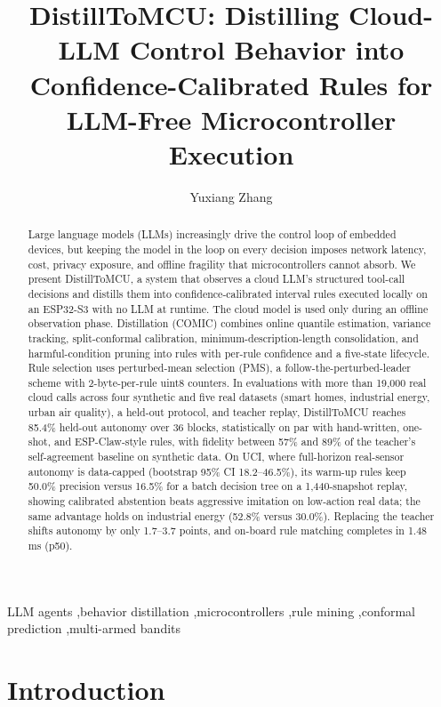 \documentclass[review]{elsarticle}
\title{DistillToMCU: Distilling Cloud-LLM Control Behavior into
Confidence-Calibrated Rules for LLM-Free Microcontroller Execution}
\author[1]{Yuxiang Zhang\corref{cor1}}
\affiliation[1]{organization={Anhui Normal University},
addressline={Huajin Campus, No. 189 Jiuhua South Road, Yijiang District},
city={Wuhu}, postcode={241002}, state={Anhui}, country={China}}
\begin{document}
\begin{frontmatter}

\begin{abstract}
Large language models (LLMs) increasingly drive the control loop of embedded
devices, but keeping the model in the loop on every decision imposes network
latency, cost, privacy exposure, and offline fragility that microcontrollers
cannot absorb. We present DistillToMCU, a system that observes a cloud LLM's
structured tool-call decisions and distills them into confidence-calibrated
interval rules executed locally on an ESP32-S3 with no LLM at runtime.
The cloud model is used only during an offline observation phase.
Distillation (COMIC) combines online quantile estimation, variance tracking,
split-conformal calibration, minimum-description-length consolidation, and
harmful-condition pruning into rules with per-rule confidence and a five-state
lifecycle. Rule selection uses perturbed-mean selection (PMS), a
follow-the-perturbed-leader scheme with 2-byte-per-rule uint8 counters. In
evaluations with more than 19,000 real cloud calls across four synthetic and
five real datasets (smart homes, industrial energy, urban air quality), a
held-out protocol, and teacher replay, DistillToMCU reaches 85.4\% held-out
autonomy over 36 blocks, statistically on par with hand-written, one-shot, and
ESP-Claw-style rules, with fidelity between 57\% and 89\% of the teacher's
self-agreement baseline on synthetic data. On UCI, where full-horizon
real-sensor autonomy is data-capped (bootstrap 95\% CI 18.2--46.5\%), its
warm-up rules keep 50.0\% precision versus 16.5\% for a batch decision tree on
a 1,440-snapshot replay, showing calibrated abstention beats aggressive
imitation on low-action real data; the same advantage holds on industrial
energy (52.8\% versus 30.0\%). Replacing the teacher shifts autonomy by only
1.7--3.7 points, and on-board rule matching completes in 1.48 ms (p50).
\end{abstract}

\begin{keyword}
LLM agents \sep behavior distillation \sep microcontrollers \sep rule mining
\sep conformal prediction \sep multi-armed bandits
\end{keyword}

\end{frontmatter}

\section{Introduction}
\end{document}
